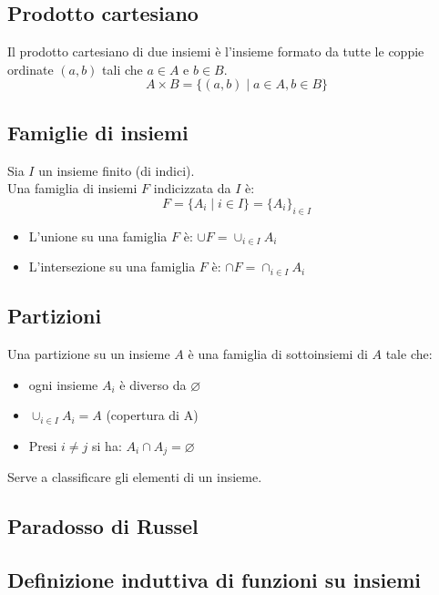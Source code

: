 \documentclass{article}
\begin{document}
\subsection*{Prodotto cartesiano}
Il prodotto cartesiano di due insiemi è l'insieme formato da tutte le coppie ordinate \((a,b)\) tali che \(a \in A\) e \(b \in B\).
\[A \times B = \{(a,b) \mid a \in A, b \in B\}\]
\subsection*{Famiglie di insiemi}
Sia \(I\) un insieme finito (di indici).\\
Una famiglia di insiemi \(F\) indicizzata da \(I\) è:
\[F = \{A_i \mid i \in I\} = \{A_i\}_{i \in I}\]
\begin{itemize}
    \item L'unione su una famiglia \(F\) è: \(\cup F = \cup_{i \in I}A_i\)
    \item L'intersezione su una famiglia \(F\) è: \(\cap F = \cap_{i \in I}A_i\)
\end{itemize}
\subsection*{Partizioni}
Una partizione su un insieme \(A\) è una famiglia di sottoinsiemi di \(A\) tale che:
\begin{itemize}
    \item ogni insieme \(A_i\) è diverso da \(\varnothing\)
    \item \(\cup_{i \in I}A_i = A\) (copertura di A)
    \item Presi \(i \neq j\) si ha: \(A_i \cap A_j = \varnothing\)
\end{itemize}
Serve a classificare  gli elementi di un insieme.

\subsection{Paradosso di Russel}

\subsection{Definizione induttiva di funzioni su insiemi}
\end{document}
